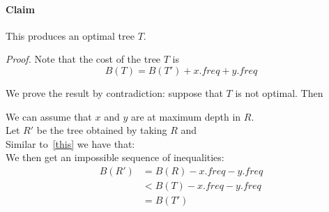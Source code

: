 \documentclass[11  pt]{article}
\begin{document}
\paragraph{Claim}
This produces an optimal tree $T$. 

\textit{Proof.}
Note that the cost of the tree $T$ is 
\begin{equation}
\label{this}
B(T) = B(T') + x.freq + y.freq
\end{equation}

\vs{2cm}


We prove the result by contradiction: suppose that $T$ is not optimal. Then %


\vs{2cm}

We can assume that $x$ and $y$ are at maximum depth in $R$. \\

%	
Let $R'$ be the tree obtained by taking $R$ and \\ %

Similar to~\eqref{this} we have that:  \\


We then get an impossible sequence of inequalities:
\begin{align*}
B(R') &= B(R) - x.freq - y.freq \\
& < B(T) - x.freq - y.freq \\
& = B(T') 
\end{align*}

\end{document}
